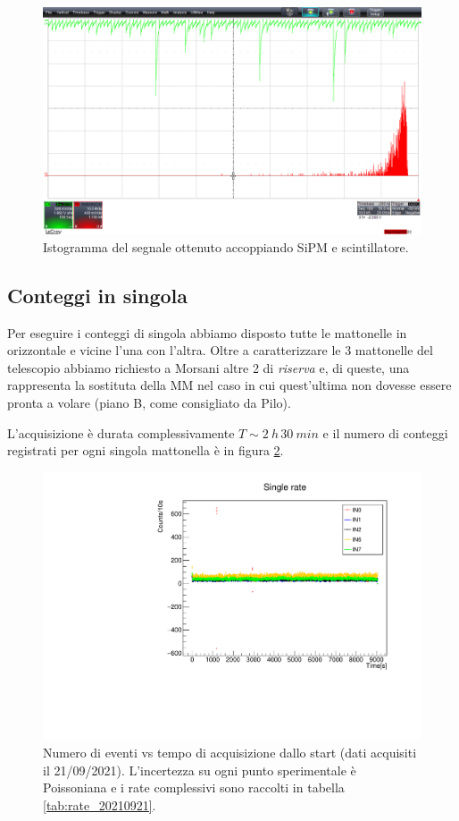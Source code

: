 \documentclass[11pt,a4paper]{article}
\begin{document}
\begin{figure}[ht!]
    \centering
    \includegraphics[scale=0.3]{Immagini/signal.png}
    \caption{Istogramma del segnale ottenuto accoppiando SiPM e scintillatore.}
    \label{fig:signal}
\end{figure}
\subsection{Conteggi in singola}
Per eseguire i conteggi di singola abbiamo disposto tutte le mattonelle in orizzontale e vicine l'una con l'altra. Oltre a caratterizzare le 3 mattonelle del telescopio abbiamo richiesto a Morsani altre 2 di \textit{riserva} e,  di queste, una rappresenta la sostituta della MM nel caso in cui quest'ultima non dovesse essere pronta a volare (piano B, come consigliato da Pilo).

L'acquisizione è durata complessivamente $T\sim \SI{2}{h}\, \SI{30}{min}$ e il numero di conteggi registrati per ogni singola mattonella è in figura \ref{fig:rate_20210921}. 

\begin{figure}[ht!]
    \centering
    \includegraphics[scale=0.5]{Immagini/single_rate_20210921.pdf}
    \caption{Numero di eventi vs tempo di acquisizione dallo start (dati acquisiti il 21/09/2021). L'incertezza su ogni punto sperimentale è Poissoniana e i rate complessivi sono raccolti in tabella \ref{tab:rate_20210921}.}
    \label{fig:rate_20210921}
\end{figure}
\end{document}
